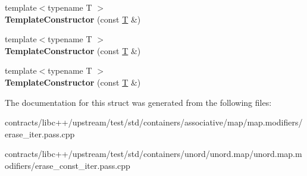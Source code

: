 \begin{DoxyCompactItemize}
{\footnotesize template$<$typename T $>$ }\\{\bfseries Template\+Constructor} (const \mbox{\hyperlink{struct_t}{T}} \&)
\item 
\mbox{\label{struct_template_constructor_a932be004f8fa3fb9cc3a5e13efe8c77a}} 
{\footnotesize template$<$typename T $>$ }\\{\bfseries Template\+Constructor} (const \mbox{\hyperlink{struct_t}{T}} \&)
\item 
\mbox{\label{struct_template_constructor_a932be004f8fa3fb9cc3a5e13efe8c77a}} 
{\footnotesize template$<$typename T $>$ }\\{\bfseries Template\+Constructor} (const \mbox{\hyperlink{struct_t}{T}} \&)
\end{DoxyCompactItemize}


The documentation for this struct was generated from the following files\+:\begin{DoxyCompactItemize}
\item 
contracts/libc++/upstream/test/std/containers/associative/map/map.\+modifiers/erase\+\_\+iter.\+pass.\+cpp\item 
contracts/libc++/upstream/test/std/containers/unord/unord.\+map/unord.\+map.\+modifiers/erase\+\_\+const\+\_\+iter.\+pass.\+cpp\end{DoxyCompactItemize}
